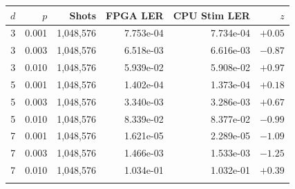 \begin{tabular}{@{}rrrrrr@{}}
\toprule
$d$ & $p$ & Shots & FPGA LER & CPU Stim LER & $z$ \\
\midrule
3 & 0.001 & 1{,}048{,}576 & 7.753e-04 & 7.734e-04 & $+0.05$ \\
3 & 0.003 & 1{,}048{,}576 & 6.518e-03 & 6.616e-03 & $-0.87$ \\
3 & 0.010 & 1{,}048{,}576 & 5.939e-02 & 5.908e-02 & $+0.97$ \\
5 & 0.001 & 1{,}048{,}576 & 1.402e-04 & 1.373e-04 & $+0.18$ \\
5 & 0.003 & 1{,}048{,}576 & 3.340e-03 & 3.286e-03 & $+0.67$ \\
5 & 0.010 & 1{,}048{,}576 & 8.339e-02 & 8.377e-02 & $-0.99$ \\
7 & 0.001 & 1{,}048{,}576 & 1.621e-05 & 2.289e-05 & $-1.09$ \\
7 & 0.003 & 1{,}048{,}576 & 1.466e-03 & 1.533e-03 & $-1.25$ \\
7 & 0.010 & 1{,}048{,}576 & 1.034e-01 & 1.032e-01 & $+0.39$ \\
\botrule
\end{tabular}
